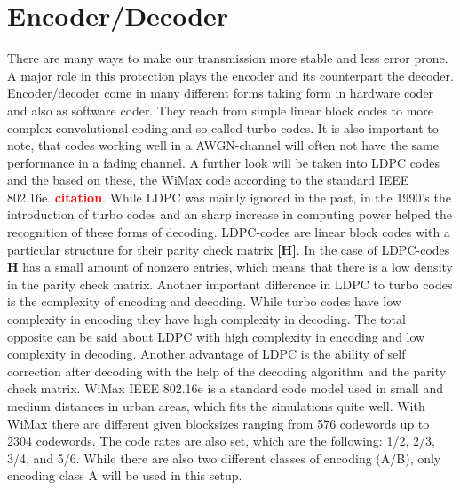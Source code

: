 \documentclass[12pt,oneside, reqno]{report}
\newcommand\boldred[1]{\textcolor{red}{\textbf{#1}}}
\begin{document}
\section{Encoder/Decoder}
\label{sec:code}
There are many ways to make our transmission more stable and less error prone. A major role in this protection plays the encoder and its counterpart the decoder. Encoder/decoder come in many different forms taking form in hardware coder and also as software coder. They reach from simple linear block codes to more complex convolutional coding and so called turbo codes. It is also important to note, that codes working well in a AWGN-channel will often not have the same performance in a fading channel. A further look will be taken into \gls{LDPC} codes and the based on these, the WiMax code according to the standard IEEE 802.16e. \boldred{citation}. While \gls{LDPC} was mainly ignored in the past, in the 1990's the introduction of turbo codes and an sharp increase in computing power helped the recognition of these forms of decoding.
\newline
\gls{LDPC}-codes are linear block codes with a particular structure for their parity check matrix \textbf{[H]}. In the case of \gls{LDPC}-codes \textbf{H} has a small amount of nonzero entries, which means that there is a low density in the parity check matrix.
Another important difference in LDPC to turbo codes is the complexity of encoding and decoding. While turbo codes have low complexity in encoding they have high complexity in decoding. The total opposite can be said about \gls{LDPC} with high complexity in encoding and low complexity in decoding. Another advantage of \gls{LDPC} is the ability of self correction after decoding with the help of the decoding algorithm and the parity check matrix.  
\newline
WiMax IEEE 802.16e is a standard code model used in small and medium distances in urban areas, which fits the simulations quite well. With WiMax there are different given blocksizes ranging from 576 codewords up to 2304 codewords. The code rates are also set, which are the following: 1/2, 2/3, 3/4, and 5/6. While there are also two different classes of encoding (A/B), only encoding class A will be used in this setup.
\newpage
\end{document}

